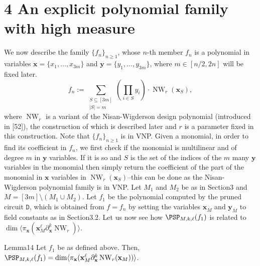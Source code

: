 \section*{4 An explicit polynomial family with high measure}
We now describe the family $\{f_n\}_{n\ge1}$, whose $n$-th member $f_n$ is a polynomial in variables $\mathbf x=\{x_1,\ldots,x_{3m}\}$ and $\mathbf y=\{y_1,\ldots,y_{3m}\}$, where $m\in[n/2,2n]$ will be fixed later.
\[
f_n:=\sum_{\substack{S\subseteq[3m]\\|S|=m}}\left(\prod_{i\in S}y_i\right)\cdot\operatorname{NW}_r(\mathbf x_S),
\]
where $\operatorname{NW}_r$ is a variant of the Nisan-Wigderson design polynomial (introduced in [52]), the construction of which is described later and $r$ is a parameter fixed in this construction. Note that $\{f_n\}_{n\ge1}$ is in VNP. Given a monomial, in order to find its coefficient in $f_n$, we first check if the monomial is multilinear and of degree $m$ in $\mathbf y$ variables. If it is so and $S$ is the set of the indices of the $m$ many $\mathbf y$ variables in the monomial then simply return the coefficient of the part of the monomial in $\mathbf x$ variables in $\operatorname{NW}_r(\mathbf x_S)$--this can be done as the Nisan-Wigderson polynomial family is in VNP.
Let $M_1$ and $M_2$ be as in Section3 and $M=[3m]\setminus(M_1\cup M_2)$. Let $f_1$ be the polynomial computed by the pruned circuit $\mathtt D$, which is obtained from $f=f_n$ by setting the variables $\mathbf x_{\overline M}$ and $\mathbf y_{\overline M}$ to field constants as in Section3.2. Let us now see how $\PSP_{M,k,\ell}(f_1)$ is related to $\dim\langle\pi_{\mathbf x}(\mathbf x_M^\ell\partial_{\mathbf x}^k\operatorname{NW}_r)\rangle$.
\begin{authorclaim}{Lemma14}
Let $f_1$ be as defined above. Then,
$\PSP_{M,k,\ell}(f_1)=\dim\langle\pi_{\mathbf x}(\mathbf x_M^\ell\partial_{\mathbf x}^k\operatorname{NW}_r(\mathbf x_M))\rangle$.
\end{authorclaim}
